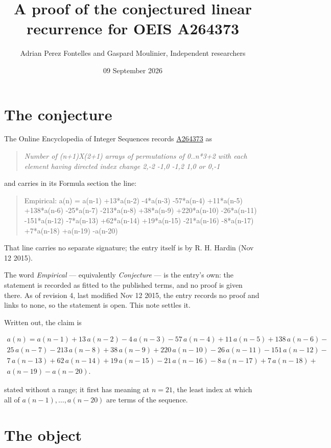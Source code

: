 \documentclass[11pt]{article}
\title{A proof of the conjectured linear recurrence for OEIS A264373}
\author{Adrian Perez Fontelles and Gaspard Moulinier, Independent researchers}
\date{09 September 2026}
\theoremstyle{definition}
\begin{document}
\maketitle
\section{The conjecture}

The Online Encyclopedia of Integer Sequences records \href{https://oeis.org/A264373}{A264373} as

\begin{quote}\itshape Number of (n+1)X(2+1) arrays of permutations of 0..n*3+2 with each element having directed index change 2,-2 -1,0 -1,2 1,0 or 0,-1\end{quote}

and carries in its Formula section the line:

\begin{quote}\ttfamily Empirical: a(n) = a(n-1) +13*a(n-2) -4*a(n-3) -57*a(n-4) +11*a(n-5) +138*a(n-6) -25*a(n-7) -213*a(n-8) +38*a(n-9) +220*a(n-10) -26*a(n-11) -151*a(n-12) -7*a(n-13) +62*a(n-14) +19*a(n-15) -21*a(n-16) -8*a(n-17) +7*a(n-18) +a(n-19) -a(n-20)\end{quote}

That line carries no separate signature; the entry itself is by R. H. Hardin (Nov 12 2015).

The word {\itshape Empirical} --- equivalently {\itshape Conjecture} --- is the entry's own: the statement is recorded as fitted to the published terms, and no proof is given there. As of revision 4, last modified Nov 12 2015, the entry records no proof and links to none, so the statement is open. This note settles it.

Written out, the claim is

\begin{multline*} a(n) = a(n-1) + 13\,a(n-2) - 4\,a(n-3) - 57\,a(n-4) + 11\,a(n-5) + 138\,a(n-6) - \\ 25\,a(n-7) - 213\,a(n-8) + 38\,a(n-9) + 220\,a(n-10) - 26\,a(n-11) - 151\,a(n-12) - \\ 7\,a(n-13) + 62\,a(n-14) + 19\,a(n-15) - 21\,a(n-16) - 8\,a(n-17) + 7\,a(n-18) + \\ a(n-19) - a(n-20). \end{multline*}

stated without a range; it first has meaning at $n = 21$, the least index at which all of $a(n-1),\dots,a(n-20)$ are terms of the sequence.

\section{The object}
\end{document}
